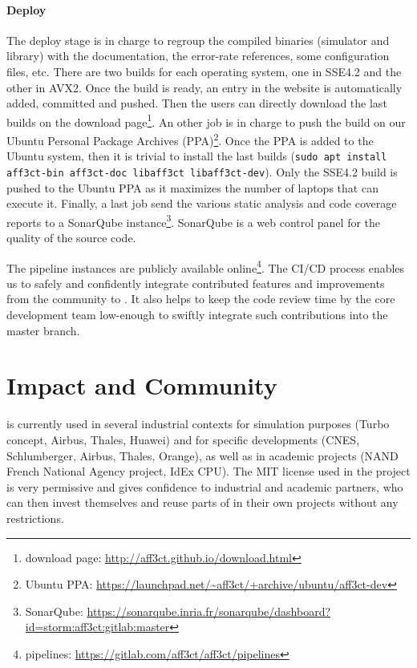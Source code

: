 \paragraph{Deploy}

The deploy stage is in charge to regroup the \AFFECT compiled binaries
(simulator and library) with the documentation, the error-rate references, some
configuration files, etc. There are two builds for each operating system, one in
SSE4.2 and the other in AVX2. Once the build is ready, an entry in the \AFFECT
website is automatically added, committed and pushed. Then the users can
directly download the last builds on the \AFFECT download page\footnote{\AFFECT
download page: \url{http://aff3ct.github.io/download.html}}. An other job is in
charge to push the \AFFECT build on our Ubuntu Personal Package Archives
(PPA)\footnote{\AFFECT Ubuntu PPA: \url{https://launchpad.net/~aff3ct/+archive/ubuntu/aff3ct-dev}}.
Once the \AFFECT PPA is added to the Ubuntu system, then it is trivial to
install the last \AFFECT builds
(\verb|sudo apt install aff3ct-bin aff3ct-doc libaff3ct libaff3ct-dev|). Only
the SSE4.2 build is pushed to the Ubuntu PPA as it maximizes the number of
laptops that can execute it. Finally, a last job send the various static
analysis and code coverage reports to a SonarQube instance\footnote{\AFFECT
SonarQube: \url{https://sonarqube.inria.fr/sonarqube/dashboard?id=storm:aff3ct:gitlab:master}}.
SonarQube is a web control panel for the quality of the source code.

The \AFFECT pipeline instances are publicly available online\footnote{\AFFECT
pipelines: \url{https://gitlab.com/aff3ct/aff3ct/pipelines}}. The CI/CD process
enables us to safely and confidently integrate contributed features and
improvements from the community to \AFFECT. It also helps to keep the code
review time by the core development team low-enough to swiftly integrate such
contributions into the master branch.

\section{Impact and Community}
\label{sec:aff3ct_impact}

\AFFECT is currently used in several industrial contexts for simulation purposes
(Turbo concept, Airbus, Thales, Huawei) and for specific developments (CNES,
Schlumberger, Airbus, Thales, Orange), as well as in academic projects (NAND
French National Agency project, IdEx CPU). The MIT license used in the project
is very permissive and gives confidence to industrial and academic partners, who
can then invest themselves and reuse parts of \AFFECT in their own projects
without any restrictions.

